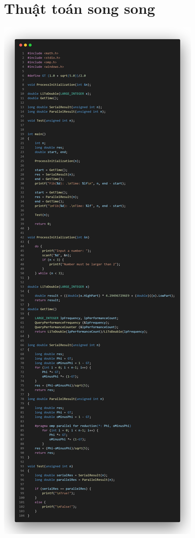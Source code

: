 \documentclass[12pt,a4paper]{report}
\begin{document}
\section{Thuật toán song song}
\begin{center}
	\includegraphics[trim=0in 20in 0in 0in, clip, scale=0.2]{./Photos/Fibonacci/Parallel.PNG}

\end{center}
\end{document}
